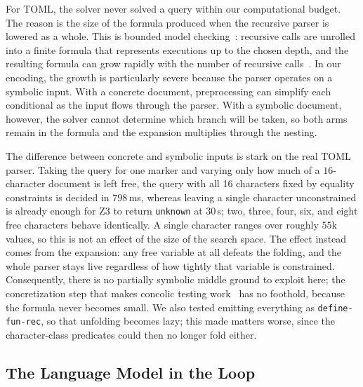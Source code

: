 \documentclass[sigconf,screen]{acmart}
\theoremstyle{definition}
\theoremstyle{remark}
\newcommand{\toml}{TOML}
\newcommand{\code}[1]{\texttt{#1}}
\begin{document}
For \toml{}, the solver never solved a query within our computational budget. The reason is the size of the formula produced when the recursive parser is lowered as a whole. This is bounded model checking~\cite{clarke2004cbmc}: recursive calls are unrolled into a finite formula that represents executions up to the chosen depth, and the resulting formula can grow rapidly with the number of recursive calls~\cite{biere1999bmc,clarke2004cbmc}. In our encoding, the growth is particularly severe because the parser operates on a symbolic input. With a concrete document, preprocessing can simplify each conditional as the input flows through the parser. With a symbolic document, however, the solver cannot determine which branch will be taken, so both arms remain in the formula and the expansion
multiplies through the nesting.

The difference between concrete and symbolic inputs is stark on the real \toml{} parser. Taking the query for one marker and varying only how much of a $16$-character document is left free, the query with all 16 characters fixed by equality constraints is decided in $798$\,ms, whereas leaving a single character unconstrained is already enough for Z3 to return \code{unknown} at $30$\,s; two, three, four, six, and eight free characters behave identically. A single character ranges over roughly $55$k values, so this is not an effect of the size
of the search space. The effect instead comes from the expansion: any free variable at all defeats the
folding, and the whole parser stays live regardless of how tightly that variable
is constrained. Consequently, there is no partially symbolic middle ground to
exploit here; the concretization step that makes concolic testing
work~\cite{cadar2008klee,poeplau2020symcc} has no foothold, because the formula
never becomes small. We also tested emitting everything as \code{define-fun-rec}, so that
unfolding becomes lazy; this made matters worse, since the character-class
predicates could then no longer fold either.

\subsection{The Language Model in the Loop}
\end{document}

